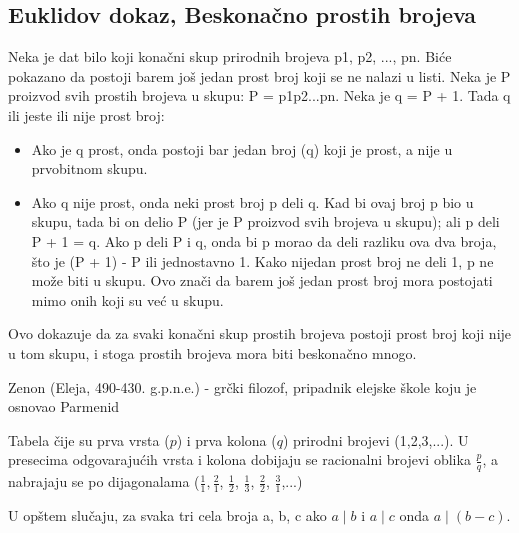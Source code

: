 \documentclass[a4paper]{article}
\begin{document}
\subsection{Euklidov dokaz, Beskonačno prostih brojeva}
Neka je dat bilo koji konačni skup prirodnih brojeva p1, p2, ..., pn. Biće pokazano da postoji barem još jedan prost broj koji se ne nalazi u listi. Neka je P proizvod svih prostih brojeva u skupu: P = p1p2...pn. Neka je q = P + 1. Tada q ili jeste ili nije prost broj:
\begin{itemize}
\item Ako je q prost, onda postoji bar jedan broj (q) koji je prost, a nije u prvobitnom skupu.
\item Ako q nije prost, onda neki prost broj p deli q. Kad bi ovaj broj p bio u skupu, tada bi on delio P (jer je P proizvod svih brojeva u skupu); ali p deli P + 1 = q. Ako p deli P i q, onda bi p morao da deli razliku
\cite{objasnjenje_deljenja} ova dva broja, što je (P + 1) - P ili jednostavno 1. Kako nijedan prost broj ne deli 1, p ne može biti u skupu. Ovo znači da barem još jedan prost broj mora postojati mimo onih koji su već u skupu.
\end{itemize} 

Ovo dokazuje da za svaki konačni skup prostih brojeva postoji prost broj koji nije u tom skupu, i stoga prostih brojeva mora biti beskonačno mnogo.


\appendix

\iffalse
 

\fi

\renewcommand{\refname}{Literatura}
\begin{thebibliography}{9}


\end{thebibliography}


\renewcommand{\refname}{Dodatak: objašnjenja}
\begin{thebibliography}{9}

 Zenon (Eleja, 490-430. g.p.n.e.) - grčki filozof, pripadnik elejske škole koju je osnovao Parmenid

 Tabela čije su prva vrsta ($p$) i prva kolona ($q$) prirodni brojevi (1,2,3,...). U presecima odgovarajućih vrsta i kolona dobijaju se racionalni brojevi oblika $\frac{p}{q}$, a nabrajaju se po dijagonalama ($\frac{1}{1}, \frac{2}{1}$, $\frac{1}{2}$, $\frac{1}{3}$, $\frac{2}{2}$, $\frac{3}{1}$,...)

U opštem slučaju, za svaka tri cela broja a, b, c ako $a \mid b$ i $a \mid c$ onda $a \mid (b - c)$.





\end{thebibliography}
\end{document}
